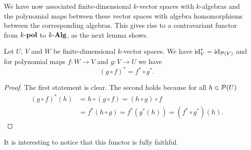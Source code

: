 We have now associated finite-dimensional $k$-vector spaces with $k$-algebras and the polynomial maps between these vector spaces with algebra homomorphisms between the corresponding algebras. This gives rise to a contravariant functor from $k\text{-}\mathbf{pol}$ to $k\text{-}\mathbf{Alg}$, as the next lemma shows.


\begin{prop}
 Let $U$, $V$ and $W$ be finite-dimensional $k$-vector spaces. We have $\operatorname{id}_V^* = \operatorname{id}_{\mathcal{P}(V)}$ and for polynomial maps $f \colon W \to V$ and $g \colon V \to U$ we have
 \[
  (g \circ f)^* = f^* \circ g^*.
 \]
\end{prop}
\begin{proof}
 The first statement is clear. The second holds because for all $h \in \mathcal{P}(U)$
 \begin{align*}
  (g \circ f)^*(h)
  &= h \circ (g \circ f) = (h \circ g) \circ f \\
  &= f^* (h \circ g) = f^*(g^*(h)) = (f^* \circ g^*)(h).
 \end{align*}
\end{proof}


It is interesting to notice that this functor is fully faithful.


